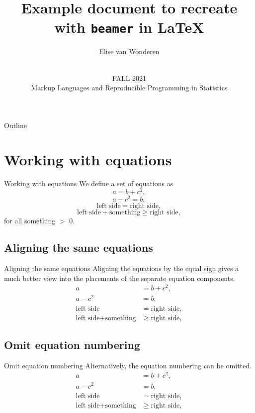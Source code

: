 \documentclass[aspectratio=169]{beamer}
\title[Example]{Example document to recreate with \texttt{beamer} in \LaTeX}
\author[EvW]{Elise van Wonderen}
\date[markup]
{\vspace{.5 in}\\ 
FALL 2021\\
Markup Languages and Reproducible Programming in Statistics}
\begin{document}
\begin{frame}[plain]
  \titlepage
\end{frame}

\begin{frame}{Outline}
\tableofcontents
\end{frame}

\section{Working with equations}
\begin{frame}{Working with equations}
  We define a set of equations as
    \begin{equation}
        a=b+c^2,
    \end{equation}
    \begin{equation}
    	a-c^2=b,
    \end{equation}
    \begin{equation}
    	\text{left side} = \text{right side},
    \end{equation}
    \begin{equation}
    	\text{left side} + \text{something} \geq \text{right side},
    \end{equation}
  for all something $>$ 0.
\end{frame}

\subsection{Aligning the same equations}
\begin{frame}{Aligning the same equations}
  Aligning the equations by the equal sign gives a much better view into the placements of the separate equation components.
    \begin{align}
        a&=b+c^2,\\
    	a-c^2&=b,\\
    	\text{left side} &= \text{right side},\\
    	\text{left side} + \text{something} & \geq \text{right side},
    	\end{align}
\end{frame}

\subsection{Omit equation numbering}
\begin{frame}{Omit equation numbering}
  Alternatively, the equation numbering can be omitted. 
    \begin{align*}
        a&=b+c^2,\\
    	a-c^2&=b,\\
    	\text{left side} &= \text{right side},\\
    	\text{left side} + \text{something} & \geq \text{right side},
    	\end{align*}
\end{frame}
\end{document}
